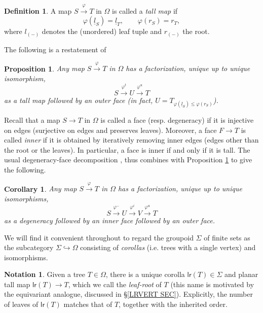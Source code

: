 \documentclass[a4paper,10pt
,draft
]{article}%
\numberwithin{equation}{section}
\numberwithin{figure}{section}
\newtheorem{proposition}[equation]{Proposition}%
\newtheorem{corollary}[equation]{Corollary}%
\theoremstyle{definition} %
\newtheorem{definition}[equation]{Definition}%
\newtheorem{notation}[equation]{Notation}%
\newcommand{\1}{\ensuremath{\mathbbm 1}}%
\begin{document}
 
\begin{definition}
	A map $S \xrightarrow{\varphi} T$ in $\Omega$ is called a \textit{tall map} if 
	\[\varphi(\underline{l}_S) = \underline{l}_T, 
		\qquad
	\varphi(r_S)= r_T,\]
where $l_{(\minus)}$ denotes the (unordered) leaf tuple and $r_{(\minus)}$ the root.
\end{definition}


The following is a restatement of \cite[Cor. 5.24]{Pe17}

\begin{proposition}\label{TALLOUTERDEC PROP}
	Any map $S \xrightarrow{\varphi} T$ in $\Omega$ has a factorization, unique up to unique isomorphism,
	\[
		S \xrightarrow{\varphi^t} U \xrightarrow{\varphi^u} T
	\]
	as a tall map followed by an outer face (in fact, 
	$U= T_{\varphi(\underline{l}_S) \leq \varphi(r_S)}$).
\end{proposition}

Recall that a map 
$S \to T$ in $\Omega$
is called a face (resp. degeneracy)
if it is injective on edges (surjective on edges and preserves leaves).
Moreover, a face $F \to T$ is called \textit{inner} if it is obtained by iteratively removing inner edges (edges other than the root or the leaves). In particular, a face is inner if and only if it is tall. 
The usual degeneracy-face decomposition
\cite[Lemma 3.1]{MW07},\cite[Prop. 5.37]{Pe17}
thus combines with Proposition \ref{TALLOUTERDEC PROP} to give the following.


\begin{corollary}
	Any map $S \xrightarrow{\varphi} T$ in $\Omega$ has a factorization, unique up to unique isomorphisms,
\[
	S \xrightarrow{\varphi^-} U
	\xrightarrow{\varphi^i} V
	\xrightarrow{\varphi^u} T
\]
	as a degeneracy followed by an inner face followed by an outer face.
\end{corollary}
	


We will find it convenient  throughout to regard the 
groupoid $\Sigma$ of finite sets 
as the subcategory 
$\Sigma \hookrightarrow \Omega$
consisting of \textit{corollas}
(i.e. trees with a single vertex)
and isomorphisms.


\begin{notation}\label{UNIQCOR NOT}
	Given a tree $T \in \Omega$, there is a unique corolla $\mathsf{lr}(T) \in \Sigma$ and planar tall map 
	$\mathsf{lr}(T) \to T$, which we call the 
	\textit{leaf-root} of $T$ (this name is motivated by the equivariant analogue, discussed in \S \ref{LRVERT SEC}).
	Explicitly, the number of leaves of $\mathsf{lr}(T)$ matches that of $T$, together with the inherited order. 
\end{notation}
\end{document}
